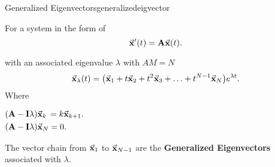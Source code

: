 \documentclass[../notes.tex]{subfiles}
\begin{document}
\begin{theorem}{Generalized Eigenvectors}{generalizedeigvector}

    For a system in the form of
    \[
        \va{x}'(t) = \vb{A}\va{x}(t)
    .\]

    with an associated eigenvalue $\lambda$ with $AM = N$
    \[
        \va{x}_\lambda (t) = \qty(\va{x}_1 + t\va{x}_2 + t^2\va{x}_3 + \hdots + t^{N-1}\va{x}_N)e^{\lambda t}
    .\]
    Where

    {
    \centering
    \begin{eqbox}
    $\begin{aligned}
        \qty(\vb{A} - \vb{I}\lambda)&\va{x}_k \, = k\va{x}_{k+1}. \\
        \qty(\vb{A} - \vb{I}\lambda)&\va{x}_N = 0
    .\end{aligned}$
    \end{eqbox}
    }

    The vector chain from $\va{x}_1$ to  $\va{x}_{N-1}$ are the \textbf{Generalized Eigenvectors} associated with  $\lambda$.

\end{theorem}
\end{document}

